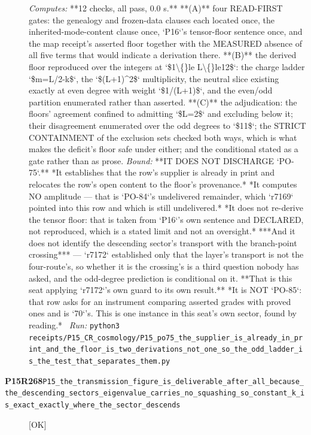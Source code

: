 \begin{description}
\emph{Computes:} **12 checks, all pass, 0.0 s.** **(A)** four READ-FIRST gates: the genealogy and frozen-data clauses each located once, the inherited-mode-content clause once, `P16`'s tensor-floor sentence once, and the map receipt's asserted floor together with the MEASURED absence of all five terms that would indicate a derivation there. **(B)** the derived floor reproduced over the integers at `\$1\textbackslash\{\}le L\textbackslash\{\}le12\$`: the charge ladder `\$m=L/2-k\$`, the `\$(L+1)\textasciicircum{}2\$` multiplicity, the neutral slice existing exactly at even degree with weight `\$1/(L+1)\$`, and the even/odd partition enumerated rather than asserted. **(C)** the adjudication: the floors' agreement confined to admitting `\$L=2\$` and excluding below it; their disagreement enumerated over the odd degrees to `\$11\$`; the STRICT CONTAINMENT of the exclusion sets checked both ways, which is what makes the deficit's floor safe under either; and the conditional stated as a gate rather than as prose.
 \emph{Bound:}  **IT DOES NOT DISCHARGE `PO-75`.** *It establishes that the row's supplier is already in print and relocates the row's open content to the floor's provenance.*  *It computes NO amplitude --- that is `PO-84`'s undelivered remainder, which `r7169` pointed into this row and which is still undelivered.*  *It does not re-derive the tensor floor: that is taken from `P16`'s own sentence and DECLARED, not reproduced, which is a stated limit and not an oversight.*  ***And it does not identify the descending sector's transport with the branch-point crossing*** --- `r7172` established only that the layer's transport is not the four-route's, so whether it is the crossing's is a third question nobody has asked, and the odd-degree prediction is conditional on it. **That is this seat applying `r7172`'s own guard to its own result.**  *It is NOT `PO-85`: that row asks for an instrument comparing asserted grades with proved ones and is `70`'s. This is one instance in this seat's own sector, found by reading.*
\ \emph{Run:} \texttt{python3 receipts/P15\_CR\_cosmology/P15\_po75\_the\_supplier\_is\_already\_in\_print\_and\_the\_floor\_is\_two\_derivations\_not\_one\_so\_the\_odd\_ladder\_is\_the\_test\_that\_separates\_them.py}
\item[\rcptlabel{P15_the_transmission_figure_is_deliverable_after_all_because_the_descending_sectors_eigenvalue_carries_no_squashing_so_constant_k_is_exact_exactly_where_the_sector_descends}{P15R268}\textbf{P15R268}\quad\texttt{P15\_the\_transmission\_figure\_is\_deliverable\_after\_all\_because\_the\_descending\_sectors\_eigenvalue\_carries\_no\_squashing\_so\_constant\_k\_is\_exact\_exactly\_where\_the\_sector\_descends}]\hfill\textsf{[OK]}\\

\end{description}
